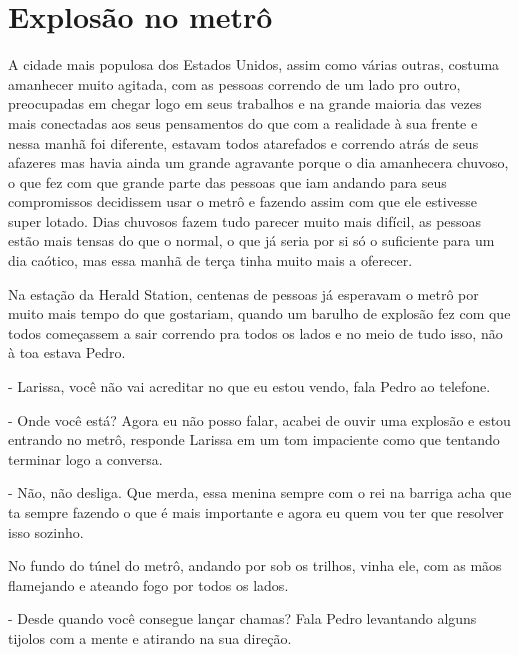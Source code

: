 
\chapter{Explosão no metrô}
    



A cidade mais populosa dos Estados Unidos, assim como várias outras, costuma amanhecer muito agitada, com as pessoas correndo de um lado pro outro, preocupadas em chegar logo em seus trabalhos e na grande maioria das vezes mais conectadas aos seus pensamentos do que com a realidade à sua frente e nessa manhã foi diferente, estavam todos atarefados e correndo atrás de seus afazeres mas havia ainda um grande agravante porque o dia amanhecera chuvoso, o que fez com que grande parte das pessoas que iam andando para seus compromissos decidissem usar o metrô e fazendo assim com que ele estivesse super lotado. Dias chuvosos fazem tudo parecer muito mais difícil, as pessoas estão mais tensas do que o normal, o que já seria por si só o suficiente para um dia caótico, mas essa manhã de terça tinha muito mais a oferecer.

Na estação da Herald Station, centenas de pessoas já esperavam o metrô por muito mais tempo do que gostariam, quando um barulho de explosão fez com que todos começassem a sair correndo pra todos os lados e no meio de tudo isso, não à toa estava Pedro.

- Larissa, você não vai acreditar no que eu estou vendo, fala Pedro ao telefone.

- Onde você está? Agora eu não posso falar, acabei de ouvir uma explosão e estou entrando no metrô, responde Larissa em um tom impaciente como que tentando terminar logo a conversa.

- Não, não desliga. Que merda, essa menina sempre com o rei na barriga acha que ta sempre fazendo o que é mais importante e agora eu quem vou ter que resolver isso sozinho.


No fundo do túnel do metrô, andando por sob os trilhos, vinha ele, com as mãos flamejando e ateando fogo por todos os lados.

- Desde quando você consegue lançar chamas? Fala Pedro levantando alguns tijolos com a mente e atirando na sua direção.

